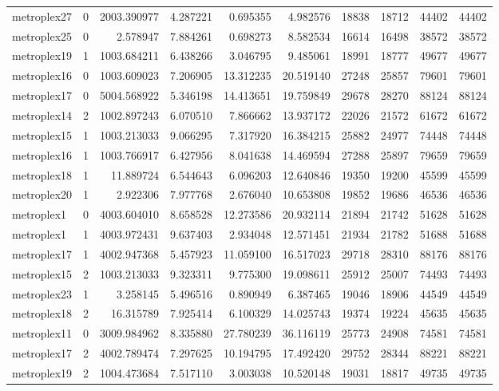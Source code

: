 \begin{longtable}{|l|r|r|r|r|r|r|r|r|r|}
metroplex27 & 0 & 2003.390977 & 4.287221 & 0.695355 & 4.982576 & 18838 & 18712 & 44402 & 44402 \\
metroplex25 & 0 & 2.578947 & 7.884261 & 0.698273 & 8.582534 & 16614 & 16498 & 38572 & 38572 \\
metroplex19 & 1 & 1003.684211 & 6.438266 & 3.046795 & 9.485061 & 18991 & 18777 & 49677 & 49677 \\
metroplex16 & 0 & 1003.609023 & 7.206905 & 13.312235 & 20.519140 & 27248 & 25857 & 79601 & 79601 \\
metroplex17 & 0 & 5004.568922 & 5.346198 & 14.413651 & 19.759849 & 29678 & 28270 & 88124 & 88124 \\
metroplex14 & 2 & 1002.897243 & 6.070510 & 7.866662 & 13.937172 & 22026 & 21572 & 61672 & 61672 \\
metroplex15 & 1 & 1003.213033 & 9.066295 & 7.317920 & 16.384215 & 25882 & 24977 & 74448 & 74448 \\
metroplex16 & 1 & 1003.766917 & 6.427956 & 8.041638 & 14.469594 & 27288 & 25897 & 79659 & 79659 \\
metroplex18 & 1 & 11.889724 & 6.544643 & 6.096203 & 12.640846 & 19350 & 19200 & 45599 & 45599 \\
metroplex20 & 1 & 2.922306 & 7.977768 & 2.676040 & 10.653808 & 19852 & 19686 & 46536 & 46536 \\
metroplex1 & 0 & 4003.604010 & 8.658528 & 12.273586 & 20.932114 & 21894 & 21742 & 51628 & 51628 \\
metroplex1 & 1 & 4003.972431 & 9.637403 & 2.934048 & 12.571451 & 21934 & 21782 & 51688 & 51688 \\
metroplex17 & 1 & 4002.947368 & 5.457923 & 11.059100 & 16.517023 & 29718 & 28310 & 88176 & 88176 \\
metroplex15 & 2 & 1003.213033 & 9.323311 & 9.775300 & 19.098611 & 25912 & 25007 & 74493 & 74493 \\
metroplex23 & 1 & 3.258145 & 5.496516 & 0.890949 & 6.387465 & 19046 & 18906 & 44549 & 44549 \\
metroplex18 & 2 & 16.315789 & 7.925414 & 6.100329 & 14.025743 & 19374 & 19224 & 45635 & 45635 \\
metroplex11 & 0 & 3009.984962 & 8.335880 & 27.780239 & 36.116119 & 25773 & 24908 & 74581 & 74581 \\
metroplex17 & 2 & 4002.789474 & 7.297625 & 10.194795 & 17.492420 & 29752 & 28344 & 88221 & 88221 \\
metroplex19 & 2 & 1004.473684 & 7.517110 & 3.003038 & 10.520148 & 19031 & 18817 & 49735 & 49735 \\

\end{longtable}
